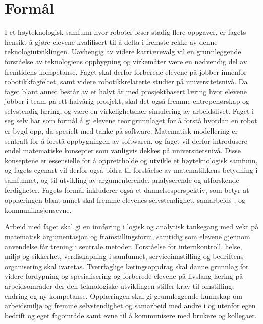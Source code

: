 \section*{Formål} \label{Sec: Formaal}

	I et høyteknologisk samfunn hvor roboter løser stadig flere oppgaver, er fagets hensikt å gjøre elevene kvalifisert til å delta i fremste rekke av denne teknologiutviklingen.
	Uavhengig av videre karriærevalg vil en grunnleggende forståelse av teknologiens oppbygning og virkemåter være en nødvendig del av fremtidens kompetanse.
	Faget skal derfor forberede elevene på jobber innenfor robotikkfagfeltet, samt videre robotikkrelaterte studier på universitetsnivå.
	Da faget blant annet består av et halvt år med prosjektbasert læring hvor elevene jobber i team på ett halvårig prosjekt, skal det også fremme entrepenørskap og selvstendig læring, og være en virkelighetsnær simulering av arbeidslivet.
	Faget i seg selv har som formål å gi elevene teorigrunnlaget for å forstå hvordan en robot er bygd opp, da spesielt med tanke på software.
	Matematisk modellering er sentralt for å forstå oppbygningen av softwaren, og faget vil derfor introdusere endel matematiske konsepter som vanligvis dekkes på universitetsnivå.
	Disse konseptene er essensielle for å opprettholde og utvikle et høyteknologisk samfunn, og fagets egenart vil derfor også bidra til forståelse av matematikkens betydning i samfunnet, og til utvikling av argumenterende, analyserende og utforskende ferdigheter.
	Fagets formål inkluderer også et dannelsesperspektiv, som betyr at opplæringen blant annet skal fremme elevenes selvstendighet, samarbeids-, og kommunikasjonsevne.

\iffalse

	Arbeid med faget skal gi en innføring i logisk og analytisk tankegang med vekt på matematisk argumentasjon og framstillingsform, samtidig som elevene gjennom anvendelse får trening i sentrale metoder.
	Forståelse for internkontroll, helse, miljø og sikkerhet, verdiskapning i samfunnet, serviceinnstilling og bedriftens organisering skal ivaretas.
	Tverrfaglige læringsoppdrag skal danne grunnlag for videre fordypning og spesialisering og forberede elevene på livslang læring på arbeidsområder der den teknologiske utviklingen stiller krav til omstilling, endring og ny kompetanse.
	Opplæringen skal gi grunnleggende kunnskap om arbeidsmiljø og fremme selvstendighet og samarbeid med andre i og utenfor egen bedrift og eget fagområde samt evne til å kommunisere med brukere og kollegaer.



